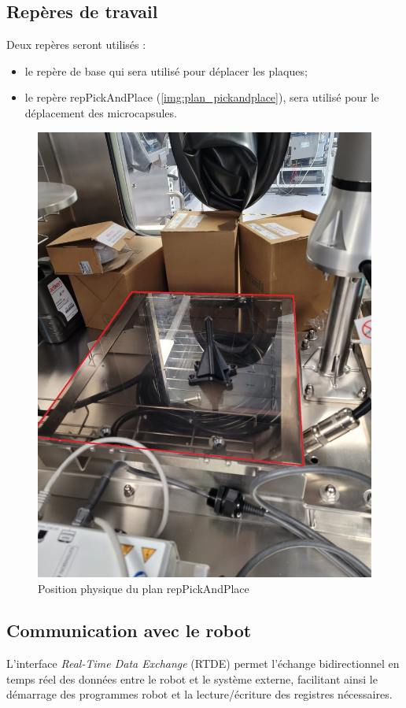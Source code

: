 \subsection{Repères de travail}
Deux repères seront utilisés :
\begin{itemize}
    \item le repère de base qui sera utilisé pour déplacer les plaques;
    \item le repère \og{}repPickAndPlace\fg{} (\cf \autoref{img:plan_pickandplace}), sera utilisé pour le déplacement des \glspl{microcapsule}.
\end{itemize}
\begin{figure}[H]
    \centering
    \includegraphics[width=\textwidth/2]{assets/figures/Hardware/plan/planPickAndPlace.jpeg}
    \caption{Position physique du plan \og{}repPickAndPlace\fg{}}
    \label{img:plan_pickandplace}
\end{figure}
\subsection{Communication avec le robot}\label{subsection:CommunicationRobot}
L'interface \textit{Real-Time Data Exchange} (RTDE) permet l'échange bidirectionnel en temps réel des données entre le robot et le système externe, facilitant ainsi le démarrage des programmes robot et la lecture/écriture des registres nécessaires.
